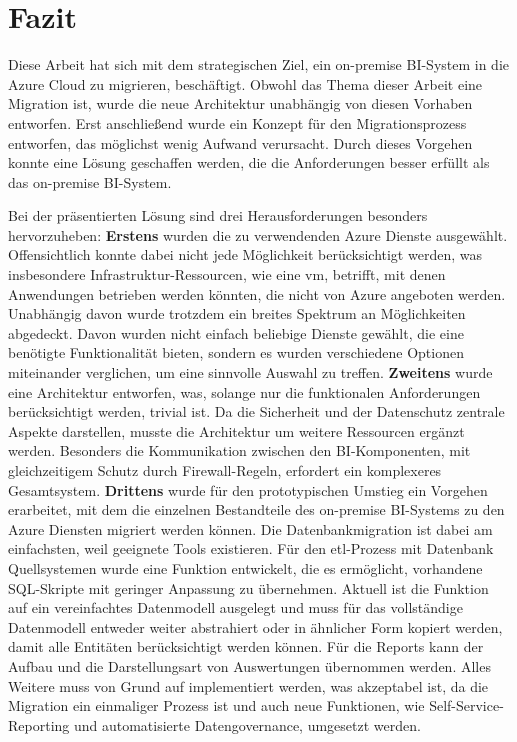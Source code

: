 \chapter{Fazit} \label{ch:zusammenfassung}
Diese Arbeit hat sich mit dem strategischen Ziel, ein on-premise BI-System in die Azure Cloud zu migrieren, beschäftigt. Obwohl das Thema dieser Arbeit eine Migration ist, wurde die neue Architektur unabhängig von diesen Vorhaben entworfen. Erst anschließend wurde ein Konzept für den Migrationsprozess entworfen, das möglichst wenig Aufwand verursacht. Durch dieses Vorgehen konnte eine Lösung geschaffen werden, die die Anforderungen besser erfüllt als das on-premise BI-System.

Bei der präsentierten Lösung sind drei Herausforderungen besonders hervorzuheben: \textbf{Erstens} wurden die zu verwendenden Azure Dienste ausgewählt. Offensichtlich konnte dabei nicht jede Möglichkeit berücksichtigt werden, was insbesondere Infrastruktur-Ressourcen, wie eine \ac{vm}, betrifft, mit denen Anwendungen betrieben werden könnten, die nicht von Azure angeboten werden. Unabhängig davon wurde trotzdem ein breites Spektrum an Möglichkeiten abgedeckt. Davon wurden nicht einfach beliebige Dienste gewählt, die eine benötigte Funktionalität bieten, sondern es wurden verschiedene Optionen miteinander verglichen, um eine sinnvolle Auswahl zu treffen. \textbf{Zweitens} wurde eine Architektur entworfen, was, solange nur die funktionalen Anforderungen berücksichtigt werden, trivial ist. Da die Sicherheit und der Datenschutz zentrale Aspekte darstellen, musste die Architektur um weitere Ressourcen ergänzt werden. Besonders die Kommunikation zwischen den BI-Komponenten, mit gleichzeitigem Schutz durch Firewall-Regeln, erfordert ein komplexeres Gesamtsystem. \textbf{Drittens} wurde für den prototypischen Umstieg ein Vorgehen erarbeitet, mit dem die einzelnen Bestandteile des on-premise BI-Systems zu den Azure Diensten migriert werden können. Die Datenbankmigration ist dabei am einfachsten, weil geeignete Tools existieren. Für den \ac{etl}-Prozess mit Datenbank Quellsystemen wurde eine Funktion entwickelt, die es ermöglicht, vorhandene SQL-Skripte mit geringer Anpassung zu übernehmen. Aktuell ist die Funktion auf ein vereinfachtes Datenmodell ausgelegt und muss für das vollständige Datenmodell entweder weiter abstrahiert oder in ähnlicher Form kopiert werden, damit alle Entitäten berücksichtigt werden können. Für die Reports kann der Aufbau und die Darstellungsart von Auswertungen übernommen werden. Alles Weitere muss von Grund auf implementiert werden, was akzeptabel ist, da die Migration ein einmaliger Prozess ist und auch neue Funktionen, wie Self-Service-Reporting und automatisierte Datengovernance, umgesetzt werden.

